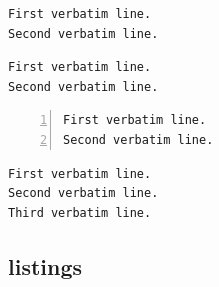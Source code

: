 %

\begin{filecontents*}{\democodefile}
\begin{Verbatim}[frame=single,label=My text]
First verbatim line.
Second verbatim line.
\end{Verbatim}
\end{filecontents*}

%

\begin{filecontents*}{\democodefile}
\begin{Verbatim}[frame=topline,
  framesep=4mm,
  label=\fbox{\Large\emph{The code}}]
First verbatim line.
Second verbatim line.
\end{Verbatim}
\end{filecontents*}

%

\begin{filecontents*}{\democodefile}
\begin{Verbatim}[numbers=left]
First verbatim line.
Second verbatim line.
\end{Verbatim}
\end{filecontents*}

%

\begin{filecontents*}{\democodefile}
\renewcommand{\FancyVerbFormatLine}[1]{%
   \ifodd\value{FancyVerbLine}%
      \MakeUppercase{#1}%
   \else%
      #1%
   \fi%
}%
\begin{Verbatim}
First verbatim line.
Second verbatim line.
Third verbatim line.
\end{Verbatim}

\renewcommand{\FancyVerbFormatLine}{}
\end{filecontents*}

%


\subsection{listings}

